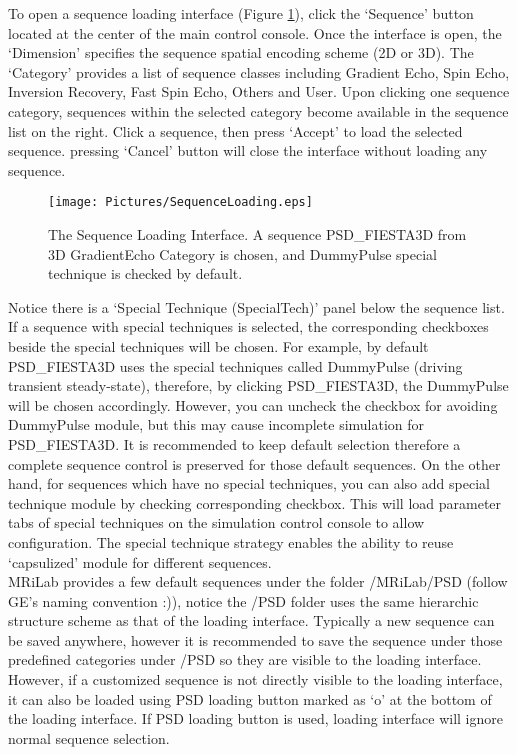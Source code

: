 \documentclass{book}%
\begin{document}
To open a sequence loading interface (Figure \ref{fig:SequenceLoading}), click the `Sequence' button located at the center of the main control console. Once the interface is open, the `Dimension' specifies the sequence spatial encoding scheme (2D or 3D). The `Category' provides a list of sequence classes including Gradient Echo, Spin Echo, Inversion Recovery, Fast Spin Echo, Others and User. Upon clicking one sequence category, sequences within the selected category become available in the sequence list on the right. Click a sequence, then press `Accept' to load the selected sequence. pressing `Cancel' button will close the interface without loading any sequence. \\

\begin{figure}[htbp]
	\centering
		\texttt{[image: Pictures/SequenceLoading.eps]}
	\caption{The Sequence Loading Interface. A sequence PSD\_FIESTA3D from 3D GradientEcho Category is chosen, and DummyPulse special technique is checked by default.}
	\label{fig:SequenceLoading}
\end{figure}

Notice there is a `Special Technique (SpecialTech)' panel below the sequence list. If a sequence with special techniques is selected, the corresponding checkboxes beside the special techniques will be chosen. For example, by default PSD\_FIESTA3D uses the special techniques called DummyPulse (driving transient steady-state), therefore, by clicking PSD\_FIESTA3D, the DummyPulse will be chosen accordingly. However, you can uncheck the checkbox for avoiding DummyPulse module, but this may cause incomplete simulation for PSD\_FIESTA3D. It is recommended to keep default selection therefore a complete sequence control is preserved for those default sequences. On the other hand, for sequences which have no special techniques, you can also add special technique module by checking corresponding checkbox. This will load parameter tabs of special techniques on the simulation control console to allow configuration. The special technique strategy enables the ability to reuse `capsulized' module for different sequences. \\

MRiLab provides a few default sequences under the folder /MRiLab/PSD (follow GE's naming convention :)), notice the /PSD folder uses the same hierarchic structure scheme as that of the loading interface. Typically a new sequence can be saved anywhere, however it is recommended to save the sequence under those predefined categories under /PSD so they are visible to the loading interface. However, if a customized sequence is not directly visible to the loading interface, it can also be loaded using PSD loading button marked as `o' at the bottom of the loading interface. If PSD loading button is used, loading interface will ignore normal sequence selection.
\end{document}
